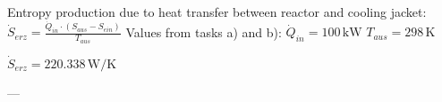 Entropy production due to heat transfer between reactor and cooling jacket:  
\( \dot{S}_{erz} = \frac{\dot{Q}_{in} \cdot (S_{aus} - S_{ein})}{T_{aus}} \)  
Values from tasks a) and b):  
\( \dot{Q}_{in} = 100 \, \text{kW} \)  
\( T_{aus} = 298 \, \text{K} \)  

\( \dot{S}_{erz} = 220.338 \, \text{W/K} \)  

---
